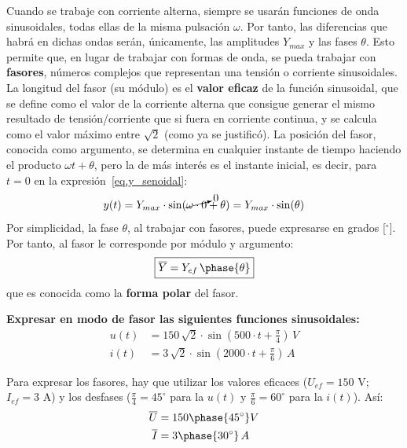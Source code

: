 	Cuando se trabaje con corriente alterna, siempre se usarán funciones de onda sinusoidales, todas ellas de la misma pulsación $\omega$. Por tanto, las diferencias que habrá en dichas ondas serán, únicamente, las amplitudes $Y_{max}$ y las fases $\theta$. Esto permite que, en lugar de trabajar con formas de onda, se pueda trabajar con \textbf{fasores}, números complejos que representan una tensión o corriente sinusoidales. %
	La longitud del fasor (su módulo) es el \textbf{valor eficaz} de la función sinusoidal, que se define como el valor de la corriente alterna que consigue generar el mismo resultado de tensión/corriente que si fuera en corriente continua, y se calcula como el valor máximo entre $\sqrt{2}$ (como ya se justificó). 
	La posición del fasor, conocida como argumento, se determina en cualquier instante de tiempo haciendo el producto $\omega t+\theta$, pero la de más interés es el instante inicial, es decir, para $t=0$ en la expresión~\eqref{eq.y_senoidal}:
	\begin{equation*}
		y(t)=Y_{max}\cdot\sin(\cancelto{0}{\omega \cdot 0}+\theta)=Y_{max}\cdot\sin(\theta)
	\end{equation*}
	Por simplicidad, la fase $\theta$, al trabajar con fasores, puede expresarse en grados [$^\circ$]. Por tanto, al fasor le corresponde por módulo y argumento:
	\begin{equation}
		\boxed{\overline{Y}=Y_{ef}\,\phase{\theta}}
	\end{equation}
	que es conocida como la \textbf{forma polar} del fasor.
	
	\begin{example}
		\textbf{Expresar en modo de fasor las siguientes funciones sinusoidales:}
		\begin{align*}
		    u(t)&=150\,\sqrt{2}\cdot \sin(500\cdot t+\frac{\pi}{4})\, V\\
		    i(t) &= 3\,\sqrt{2}\cdot \sin(2000\cdot t+\frac{\pi}{6})\,A
		\end{align*}
		
		Para expresar los fasores, hay que utilizar los valores eficaces ($U_{ef}=150$ V; $I_{ef}=3$ A) y los desfases ($\frac{\pi}{4}=45^\circ$ para la $u(t)$ y $\frac{\pi}{6}=60^\circ$ para la $i(t)$). Así: 
		\begin{align*}
		    \overline{U}&=150\phase{45^\circ} V\\
		    \overline{I}&=3\phase{30^\circ}\,A
		\end{align*}
	\end{example}
	

